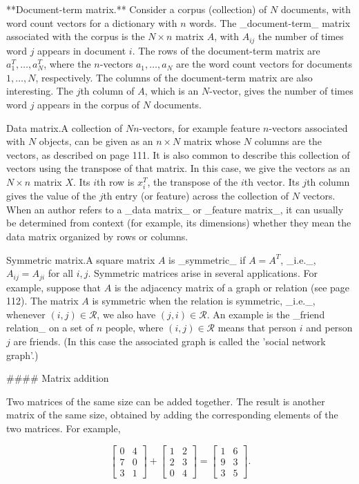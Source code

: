 

**Document-term matrix.** Consider a corpus (collection) of \(N\) documents, with word count vectors for a dictionary with \(n\) words. The _document-term_ matrix associated with the corpus is the \(N\times n\) matrix \(A\), with \(A_{ij}\) the number of times word \(j\) appears in document \(i\). The rows of the document-term matrix are \(a_{1}^{T},\ldots,a_{N}^{T}\), where the \(n\)-vectors \(a_{1},\ldots,a_{N}\) are the word count vectors for documents \(1,\ldots,N\), respectively. The columns of the document-term matrix are also interesting. The \(j\)th column of \(A\), which is an \(N\)-vector, gives the number of times word \(j\) appears in the corpus of \(N\) documents.

Data matrix.A collection of \(N\)\(n\)-vectors, for example feature \(n\)-vectors associated with \(N\) objects, can be given as an \(n\times N\) matrix whose \(N\) columns are the vectors, as described on page 111. It is also common to describe this collection of vectors using the transpose of that matrix. In this case, we give the vectors as an \(N\times n\) matrix \(X\). Its \(i\)th row is \(x_{i}^{T}\), the transpose of the \(i\)th vector. Its \(j\)th column gives the value of the \(j\)th entry (or feature) across the collection of \(N\) vectors. When an author refers to a _data matrix_ or _feature matrix_, it can usually be determined from context (for example, its dimensions) whether they mean the data matrix organized by rows or columns.

Symmetric matrix.A square matrix \(A\) is _symmetric_ if \(A=A^{T}\), _i.e._, \(A_{ij}=A_{ji}\) for all \(i,j\). Symmetric matrices arise in several applications. For example, suppose that \(A\) is the adjacency matrix of a graph or relation (see page 112). The matrix \(A\) is symmetric when the relation is symmetric, _i.e._, whenever \((i,j)\in\mathcal{R}\), we also have \((j,i)\in\mathcal{R}\). An example is the _friend relation_ on a set of \(n\) people, where \((i,j)\in\mathcal{R}\) means that person \(i\) and person \(j\) are friends. (In this case the associated graph is called the 'social network graph'.)

#### Matrix addition

Two matrices of the same size can be added together. The result is another matrix of the same size, obtained by adding the corresponding elements of the two matrices. For example,

\[\left[\begin{array}{cc}0&4\\ 7&0\\ 3&1\end{array}\right]+\left[\begin{array}{cc}1&2\\ 2&3\\ 0&4\end{array}\right]=\left[\begin{array}{cc}1&6\\ 9&3\\ 3&5\end{array}\right].\]

